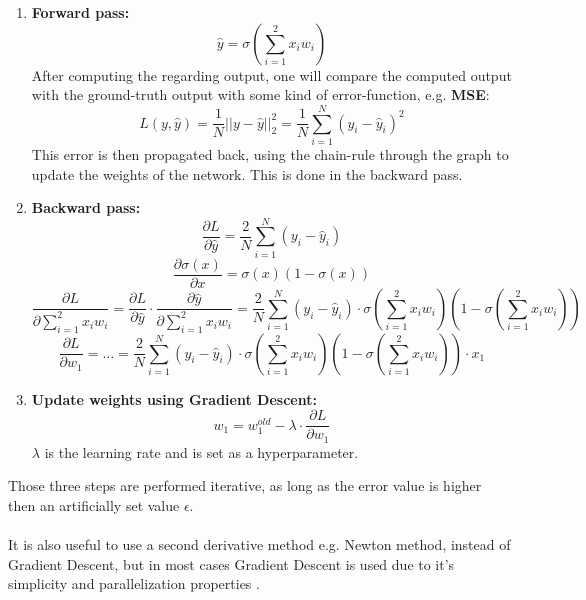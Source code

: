   \begin{enumerate}
   \item \textbf{Forward pass:}
  \begin{equation}
   \hat{y} = \sigma(\sum_{i=1}^{2}x_iw_i)
  \end{equation}
  After computing the regarding output, one will compare the computed output with the ground-truth output with some kind of error-function, e.g. \textbf{MSE}:
  \begin{equation} \label{equation::mse}
   L(y,\hat{y}) = \frac{1}{N}||y-\hat{y}||_2^2 = \frac{1}{N}\sum_{i=1}^{N}(y_i-\hat{y}_i)^2
  \end{equation}    
  This error is then propagated back, using the chain-rule through the
  graph to update the weights of the network. This is done in the backward pass.\\
  \item \textbf{Backward pass:}
  \begin{equation}
   \frac{\partial L}{\partial \hat{y}} = \frac{2}{N}\sum_{i=1}^{N}(y_i-\hat{y}_i)
  \end{equation}
  \begin{equation} \label{equation::sigma_derivative}
   \frac{\partial \sigma(x)}{\partial x} = \sigma(x)(1-\sigma(x))
  \end{equation}
  \begin{equation}
   \frac{\partial L}{\partial \sum_{i=1}^{2}x_iw_i} = \frac{\partial L}{\partial \hat{y}} \cdot \frac{\partial \hat{y}}{\partial \sum_{i=1}^{2}x_iw_i} = \frac{2}{N}\sum_{i=1}^{N}(y_i-\hat{y}_i) \cdot
   \sigma(\sum_{i=1}^{2}x_iw_i)(1-\sigma(\sum_{i=1}^{2}x_iw_i))
  \end{equation}
  \begin{equation}
   \frac{\partial L}{\partial w_1} = \ldots = \frac{2}{N}\sum_{i=1}^{N}(y_i-\hat{y}_i) \cdot \sigma(\sum_{i=1}^{2}x_iw_i)(1-\sigma(\sum_{i=1}^{2}x_iw_i)) \cdot x_1
  \end{equation}
  \item \textbf{Update weights using Gradient Descent:}
  \begin{equation}
   w_1 = w_1^{old} - \lambda \cdot \frac{\partial L}{\partial w_1}
  \end{equation}
  $\lambda$ is the learning rate and is set as a hyperparameter.
  \end{enumerate}
  Those three steps are performed iterative, as long as the error value is higher then an artificially set value $\epsilon$.\\\\
  It is also useful to use a second derivative method e.g. Newton method, instead of Gradient Descent, but in most cases Gradient Descent is used
  due to it's simplicity and parallelization properties \cite{Rumelhart1986}.
 
